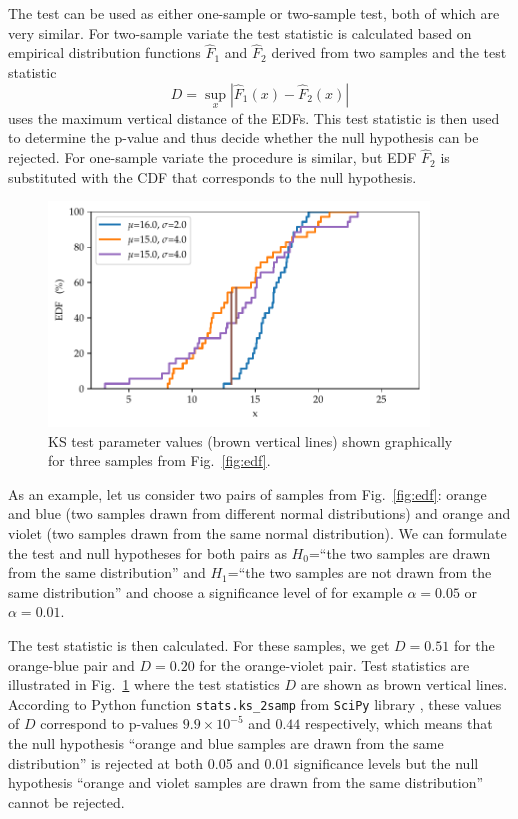 \documentclass[english, twoside]{HYgradu}
\begin{document}
The test can be used as either one-sample or two-sample test, both of which are very similar. For two-sample variate the test statistic is calculated based on empirical distribution functions $\hat{F}_1$ and $\hat{F}_2$ derived from two samples and the test statistic
\begin{equation}
	D = \sup_{x} |\hat{F}_1(x) - \hat{F}_2(x)|
\end{equation}
uses the maximum vertical distance of the EDFs. This test statistic is then used to determine the p-value and thus decide whether the null hypothesis can be rejected. For one-sample variate the procedure is similar, but EDF $\hat{F}_2$ is substituted with the CDF that corresponds to the null hypothesis.

\begin{figure}
   \centering
   \includegraphics[width=0.9\textwidth]{kuvat/kstest.pdf}
   \caption{KS test parameter values (brown vertical lines) shown graphically for three samples from Fig.\ \ref{fig:edf}.}
   \label{fig:ks} 
\end{figure}

As an example, let us consider two pairs of samples from Fig.\ \ref{fig:edf}: orange and blue (two samples drawn from different normal distributions) and orange and violet (two samples drawn from the same normal distribution). We can formulate the test and null hypotheses for both pairs as $H_0$=``the two samples are drawn from the same distribution'' and $H_1$=``the two samples are not drawn from the same distribution'' and choose a significance level of for example $\alpha=0.05$ or $\alpha=0.01$.

The test statistic is then calculated. For these samples, we get $D=0.51$ for the orange-blue pair and $D=0.20$ for the orange-violet pair. Test statistics are illustrated in Fig.\ \ref{fig:ks} where the test statistics $D$ are shown as brown vertical lines. According to Python function \texttt{stats.ks\_2samp} from \texttt{SciPy} library \citep{scipy}, these values of $D$ correspond to p-values $9.9\times 10^{-5}$ and $0.44$ respectively, which means that the null hypothesis ``orange and blue samples are drawn from the same distribution'' is rejected at both 0.05 and 0.01 significance levels but the null hypothesis ``orange and violet samples are drawn from the same distribution'' cannot be rejected.
\end{document}
